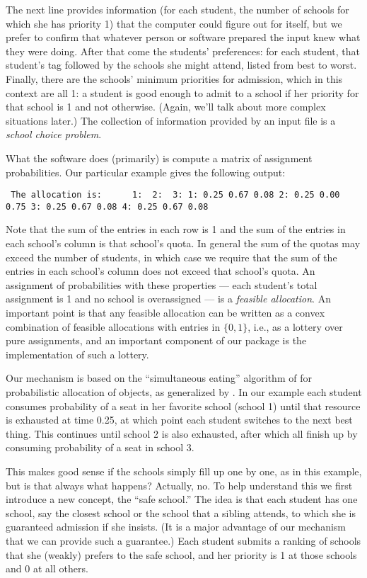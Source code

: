 \documentclass[12pt]{article}
\theoremstyle{definition}
\begin{document}
The next line provides information (for each student, the number of
schools for which she has priority 1) that the computer could figure
out for itself, but we prefer to confirm that whatever person or
software prepared the input knew what they were doing.  After that
come the students' preferences: for each student, that student's tag
followed by the schools she might attend, listed from best to worst.
Finally, there are the schools' minimum priorities for admission,
which in this context are all 1: a student is good enough to admit to
a school if her priority for that school is 1 and not
otherwise. (Again, we'll talk about more complex situations later.)
The collection of information provided by an input file is a
\emph{school choice problem}.

What the software does (primarily) is compute a matrix of assignment
probabilities.  Our particular example gives the following output:
\begin{obeylines}\texttt{
The allocation is:
\ \ \ \ \ 1:    \    2:  \      3:
1:      0.25     0.67     0.08
2:      0.25     0.00     0.75
3:      0.25     0.67     0.08
4:      0.25     0.67     0.08
}
\end{obeylines} \noindent
Note that the sum of the entries in each row is 1 and the sum of the
entries in each school's column is that school's quota.  In general
the sum of the quotas may exceed the number of students, in which case
we require that the sum of the entries in each school's column does
not exceed that school's quota. An assignment of probabilities with
these properties --- each student's total assignment is 1 and no
school is overassigned --- is a \emph{feasible allocation}.  An
important point \citep{bckm13aer} is that any feasible allocation can
be written as a convex combination of feasible allocations with
entries in $\{0,1\}$, i.e., as a lottery over pure assignments, and an
important component of our package is the implementation of such a
lottery.

Our mechanism is based on the ``simultaneous eating'' algorithm of
\cite{bm01} for probabilistic allocation of objects, as generalized by
\cite{balbuzanov22jet}.  In our example each student consumes
probability of a seat in her favorite school (school 1) until that
resource is exhausted at time 0.25, at which point each student
switches to the next best thing.  This continues until school 2 is
also exhausted, after which all finish up by consuming probability of
a seat in school 3.

This makes good sense if the schools simply fill up one by one, as in
this example, but is that always what happens?  Actually, no.  To help
understand this we first introduce a new concept, the ``safe school.''
The idea is that each student has one school, say the closest school
or the school that a sibling attends, to which she is guaranteed
admission if she insists.  (It is a major advantage of our mechanism
that we can provide such a guarantee.)  Each student submits a ranking
of schools that she (weakly) prefers to the safe school, and her
priority is 1 at those schools and 0 at all others.
\end{document}
